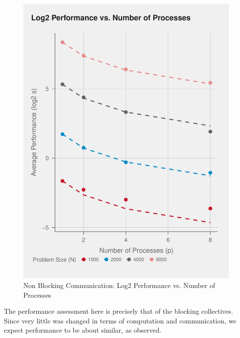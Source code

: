 \documentclass{article}
\begin{document}
\begin{figure}[H]
   \centering
   \includegraphics[scale=0.7]{../part2/out/np-6.pdf} 
   \caption{Non Blocking Communication: Log2 Performance vs. Number of Processes}
\end{figure}
\noindent The performance assessment here is precisely that of the blocking collectives. Since 
very little was changed in terms of computation and communication, we expect performance 
to be about similar, as observed.
\end{document}
